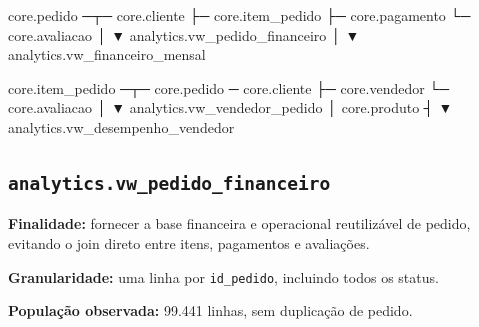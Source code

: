 \documentclass[12pt,a4paper]{article}
\newenvironment{Shaded}{}{}
\newcommand{\NormalTok}[1]{#1}
\begin{document}
\begin{Shaded}
\begin{Highlighting}[]
\NormalTok{core.pedido ─┬─ core.cliente}
\NormalTok{             ├─ core.item\_pedido}
\NormalTok{             ├─ core.pagamento}
\NormalTok{             └─ core.avaliacao}
\NormalTok{                      │}
\NormalTok{                      ▼}
\NormalTok{        analytics.vw\_pedido\_financeiro}
\NormalTok{                      │}
\NormalTok{                      ▼}
\NormalTok{        analytics.vw\_financeiro\_mensal}

\NormalTok{core.item\_pedido ─┬─ core.pedido ─ core.cliente}
\NormalTok{                  ├─ core.vendedor}
\NormalTok{                  └─ core.avaliacao}
\NormalTok{                           │}
\NormalTok{                           ▼}
\NormalTok{           analytics.vw\_vendedor\_pedido}
\NormalTok{                           │}
\NormalTok{              core.produto ┤}
\NormalTok{                           ▼}
\NormalTok{        analytics.vw\_desempenho\_vendedor}
\end{Highlighting}
\end{Shaded}

\subsection{\texorpdfstring{\nolinkurl{analytics.vw_pedido_financeiro}}{}}\label{docs__analytics__estruturas_schema_analytics.md__analytics.vw_pedido_financeiro}

\textbf{Finalidade:} fornecer a base financeira e operacional
reutilizável de pedido, evitando o join direto entre itens, pagamentos e
avaliações.

\textbf{Granularidade:} uma linha por \nolinkurl{id_pedido}, incluindo
todos os status.

\textbf{População observada:} 99.441 linhas, sem duplicação de pedido.
\end{document}
